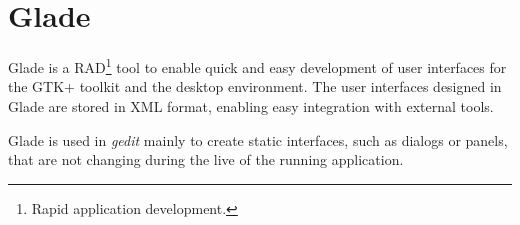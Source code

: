 
\section[Glade]{Glade\cite{website:glade}}\label{sec:Glade}

Glade is a RAD\footnote{Rapid application development.} tool to enable quick and easy development of user interfaces for the GTK+ toolkit and the \GNOME desktop environment. The user interfaces designed in Glade are stored in XML format, enabling easy integration with external tools.

Glade is used in \emph{gedit} mainly to create static interfaces, such as dialogs or panels, that are not changing during the live of the running application.
